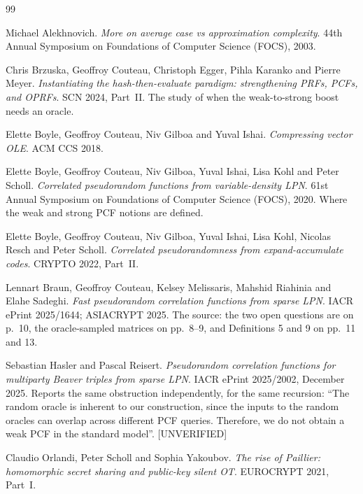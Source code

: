 \documentclass{conjura-conjecture}
\begin{document}
\begin{conjurabibliography}{99}

Michael Alekhnovich.
\emph{More on average case vs approximation complexity}.
44th Annual Symposium on Foundations of Computer Science (FOCS), 2003.

Chris Brzuska, Geoffroy Couteau, Christoph Egger, Pihla Karanko and
Pierre Meyer.
\emph{Instantiating the hash-then-evaluate paradigm: strengthening PRFs,
PCFs, and OPRFs}.
SCN 2024, Part~II\@.
The study of when the weak-to-strong boost needs an oracle.

Elette Boyle, Geoffroy Couteau, Niv Gilboa and Yuval Ishai.
\emph{Compressing vector OLE}.
ACM CCS 2018.

Elette Boyle, Geoffroy Couteau, Niv Gilboa, Yuval Ishai, Lisa Kohl and
Peter Scholl.
\emph{Correlated pseudorandom functions from variable-density LPN}.
61st Annual Symposium on Foundations of Computer Science (FOCS), 2020.
Where the weak and strong PCF notions are defined.

Elette Boyle, Geoffroy Couteau, Niv Gilboa, Yuval Ishai, Lisa Kohl,
Nicolas Resch and Peter Scholl.
\emph{Correlated pseudorandomness from expand-accumulate codes}.
CRYPTO 2022, Part~II\@.

Lennart Braun, Geoffroy Couteau, Kelsey Melissaris, Mahshid Riahinia and
Elahe Sadeghi.
\emph{Fast pseudorandom correlation functions from sparse LPN}.
IACR ePrint 2025/1644; ASIACRYPT 2025.
The source: the two open questions are on p.\ 10, the oracle-sampled
matrices on pp.\ 8--9, and Definitions 5 and 9 on pp.\ 11 and 13.

Sebastian Hasler and Pascal Reisert.
\emph{Pseudorandom correlation functions for multiparty Beaver triples
from sparse LPN}.
IACR ePrint 2025/2002, December 2025.
Reports the same obstruction independently, for the same recursion:
``The random oracle is inherent to our construction, since the inputs to
the random oracles can overlap across different PCF queries. Therefore,
we do not obtain a weak PCF in the standard model''.
[UNVERIFIED]

Claudio Orlandi, Peter Scholl and Sophia Yakoubov.
\emph{The rise of Paillier: homomorphic secret sharing and public-key
silent OT}.
EUROCRYPT 2021, Part~I\@.

\end{conjurabibliography}
\end{document}
